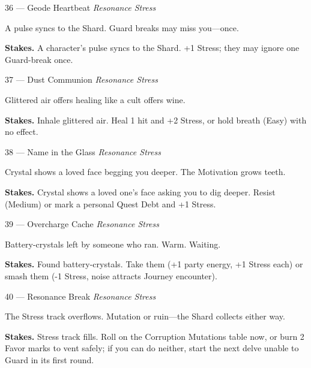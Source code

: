 \begin{encounterentry}{36 --- Geode Heartbeat}
\textit{Resonance Stress}

A pulse syncs to the Shard. Guard breaks may miss you---once.

\textbf{Stakes.} A character's pulse syncs to the Shard. +1 Stress; they may ignore one Guard-break once.
\end{encounterentry}

\begin{encounterentry}{37 --- Dust Communion}
\textit{Resonance Stress}

Glittered air offers healing like a cult offers wine.

\textbf{Stakes.} Inhale glittered air. Heal 1 hit and +2 Stress, or hold breath (Easy) with no effect.
\end{encounterentry}

\begin{encounterentry}{38 --- Name in the Glass}
\textit{Resonance Stress}

Crystal shows a loved face begging you deeper. The Motivation grows teeth.

\textbf{Stakes.} Crystal shows a loved one's face asking you to dig deeper. Resist (Medium) or mark a personal Quest Debt and +1 Stress.
\end{encounterentry}

\begin{encounterentry}{39 --- Overcharge Cache}
\textit{Resonance Stress}

Battery-crystals left by someone who ran. Warm. Waiting.

\textbf{Stakes.} Found battery-crystals. Take them (+1 party energy, +1 Stress each) or smash them (-1 Stress, noise attracts Journey encounter).
\end{encounterentry}

\begin{encounterentry}{40 --- Resonance Break}
\textit{Resonance Stress}

The Stress track overflows. Mutation or ruin---the Shard collects either way.

\textbf{Stakes.} Stress track fills. Roll on the Corruption Mutations table now, or burn 2 Favor marks to vent safely; if you can do neither, start the next delve unable to Guard in its first round.
\end{encounterentry}

